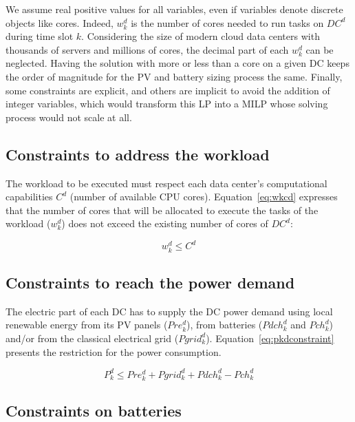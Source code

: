 We assume real positive values for all variables, even if variables denote discrete objects like cores. Indeed, $w_k^d$ is the number of cores needed to run tasks on $DC^d$ during time slot $k$. Considering the size of modern cloud data centers with thousands of servers and millions of cores, the decimal part of each $w_k^d$ can be neglected. Having the solution with more or less than a core on a given DC keeps the order of magnitude for the PV and battery sizing process the same. Finally, some constraints are explicit, and others are implicit to avoid the addition of integer variables, which would transform this LP into a MILP whose solving process would not scale at all.

\subsection{Constraints to address the workload}

The workload to be executed must respect each data center's computational capabilities $C^d$ (number of available CPU cores). Equation~\eqref{eq:wkcd} expresses that the number of cores that will be allocated to execute the tasks of the workload ($w_k^d$) does not exceed the existing number of cores of $DC^d$:

\begin{equation}\label{eq:wkcd}
    w_k^d \leq C^d
\end{equation}


\subsection{Constraints to reach the power demand}

The electric part of each DC has to supply the DC power demand using local renewable energy from its PV panels ($Pre_k^d$), from batteries ($Pdch_k^d$ and $Pch_k^d$) and/or from the classical electrical grid ($Pgrid_k^d$). Equation~\eqref{eq:pkdconstraint} presents the restriction for the power consumption.

\begin{equation} \label{eq:pkdconstraint}
    P^d_k \leq Pre^d_k + Pgrid^d_k + Pdch_k^d - Pch_k^d
\end{equation}

\subsection{Constraints on batteries}

